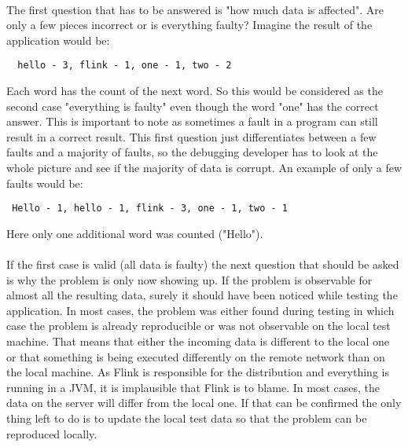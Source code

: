 \paragraph{} The first question that has to be answered is
"how much data is affected". Are only a few pieces incorrect or is everything faulty? Imagine the result of the application would be:
\begin{lstlisting}
  hello - 3, flink - 1, one - 1, two - 2
\end{lstlisting}
  Each word has the count of the next word. So this would be considered as the second case "everything is faulty" even though the word "one" has the correct answer. This is important to note as sometimes a fault in a program can still result in a correct result. This first question just differentiates between a few faults and a majority of faults, so the debugging developer has to look at the whole picture and see if the majority of data is corrupt. An example of only a few faults would be:
\begin{lstlisting}
 Hello - 1, hello - 1, flink - 3, one - 1, two - 1
\end{lstlisting}
Here only one additional word was counted ("Hello").
\paragraph{} If the first case is valid (all data is faulty) the next question that should be asked is why the problem is only now showing up. If the problem is observable for almost all the resulting data, surely it should have been noticed while testing the application. In most cases, the problem was either found during testing in which case the problem is already reproducible or was not observable on the local test machine. That means that either the incoming data is different to the local one or that something is being executed differently on the remote network than on the local machine. As Flink is responsible for the distribution and everything is running in a JVM, it is implausible that Flink is to blame. In most cases, the data on the server will differ from the local one. If that can be confirmed the only thing left to do is to update the local test data so that the problem can be reproduced locally.

